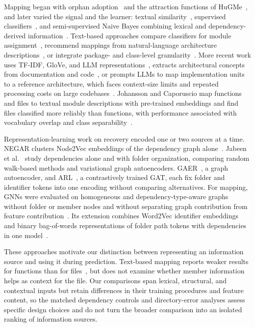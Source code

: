 Mapping began with orphan adoption~\cite{tzerpos1997orphan} and the attraction functions of HuGMe~\cite{christl2005equipping,christl2007automated}, and later varied the signal and the learner: textual similarity~\cite{bittencourt_IR}, supervised classifiers~\cite{bibi2016supervised}, and semi-supervised Naive Bayes combining lexical and dependency-derived information~\cite{olsson2019semi,olsson2022automatically}. Text-based approaches compare classifiers for module assignment~\cite{florean2021textclassifierscomparison}, recommend mappings from natural-language architecture descriptions~\cite{InMap}, or integrate package- and class-level granularity~\cite{sinkala2023integrated}. More recent work uses TF-IDF, GloVe, and LLM representations~\cite{johansson2024mapping}, extracts architectural concepts from documentation and code~\cite{fuchss2025enabling}, or prompts LLMs to map implementation units to a reference architecture, which faces context-size limits and repeated processing costs on large codebases~\cite{rukmono_deductive}. Johansson and Caporuscio map functions and files to textual module descriptions with pre-trained embeddings and find files classified more reliably than functions, with performance associated with vocabulary overlap and class separability~\cite{johansson2025mapping}.

Representation-learning work on recovery encoded one or two sources at a time. NEGAR clusters Node2Vec embeddings of the dependency graph alone~\cite{negar}. Jabeen et al.~\cite{structsar} study dependencies alone and with folder organization, comparing random walk-based methods and variational graph autoencoders. GAER~\cite{gaer}, a graph autoencoder, and ARL~\cite{arl_2026}, a contrastively trained GAT, each fix folder and identifier tokens into one encoding without comparing alternatives. For mapping, GNNs were evaluated on homogeneous and dependency-type-aware graphs without folder or member nodes and without separating graph contribution from feature contribution~\cite{jabeen2025graph}. Its extension combines Word2Vec identifier embeddings and binary bag-of-words representations of folder path tokens with dependencies in one model~\cite{c2a_mapping}.

These approaches motivate our distinction between representing an information source and using it during prediction. Text-based mapping reports weaker results for functions than for files~\cite{johansson2025mapping}, but does not examine whether member information helps as context for the file. Our comparisons span lexical, structural, and contextual inputs but retain differences in their training procedures and feature content, so the matched dependency controls and directory-error analyses assess specific design choices and do not turn the broader comparison into an isolated ranking of information sources.


